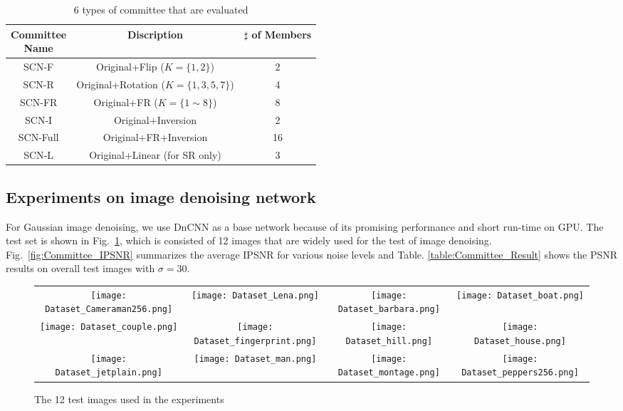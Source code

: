 \documentclass[journal]{IEEEtran}
\begin{document}
\begin{table}
	\caption{6 types of committee that are evaluated}
	\vspace{.0cm}
	\label{table:Committe_Denoising}
	\centering
	\setlength{\tabcolsep}{5pt}
	\begin{tabular}{ |c|c|c| }
		\hline
		\makecell{Committee \\ Name}& Discription & \makecell{$\sharp$ of \\Members} \\ 
		\hline
		\hline
		SCN-F & Original+Flip ($K=\{1, 2\}$) & 2\\ 
		\hline
		SCN-R & Original+Rotation ($K=\{1, 3, 5, 7\}$) & 4 \\
		\hline
		SCN-FR & Original+FR ($K=\{1\sim8\}$) & 8 \\
		\hline
		SCN-I & Original+Inversion & 2 \\
		\hline
		SCN-Full & Original+FR+Inversion & 16 \\
		\hline		
		SCN-L & Original+Linear (for SR only) & 3 \\
		\hline		
	\end{tabular}
\end{table}

\subsection{Experiments on image denoising network}
For Gaussian image denoising, we use DnCNN \cite{zhang2016beyond} as a base network 
because of its promising performance and short run-time on GPU.  The test set is shown in 
Fig.~\ref{fig:Committee_Testimg}, which is consisted of 12 images that are widely used 
for the test of image denoising. Fig.~\ref{fig:Committee_IPSNR} summarizes the average 
IPSNR for various noise levels and Table. \ref{table:Committee_Result} shows the PSNR 
results on overall test images with $\sigma = 30$.

\begin{figure}
	\centering
	\begin{tabular}[t]{cccc}
		\texttt{[image: Dataset\_Cameraman256.png]}&
		\texttt{[image: Dataset\_Lena.png]}&
		\texttt{[image: Dataset\_barbara.png]}&
		\texttt{[image: Dataset\_boat.png]}\\
		\texttt{[image: Dataset\_couple.png]}&
		\texttt{[image: Dataset\_fingerprint.png]}&
		\texttt{[image: Dataset\_hill.png]}&
		\texttt{[image: Dataset\_house.png]}\\
		\texttt{[image: Dataset\_jetplain.png]}&
		\texttt{[image: Dataset\_man.png]}&
		\texttt{[image: Dataset\_montage.png]}&
		\texttt{[image: Dataset\_peppers256.png]}\\
	\end{tabular}
	\caption{The 12 test images used in the experiments}
	\label{fig:Committee_Testimg}
\end{figure} 
\end{document}
